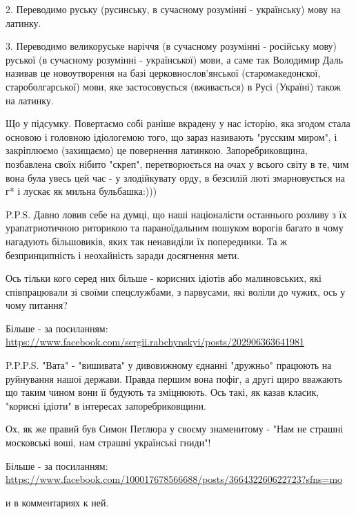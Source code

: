 2. Переводимо руську (русинську, в сучасному розумінні - українську) мову на
латинку.

3. Переводимо великоруське наріччя (в сучасному розумінні - російську мову)
руської (в сучасному розумінні - української) мови, а саме так Володимир Даль
називав це новоутворення на базі церковнослов'янської (старомакедонскої,
староболгарської) мови, яке застосовується (вживається) в Русі (Україні) також
на латинку.

Що у підсумку. Повертаємо собі раніше вкрадену у нас історію, яка згодом стала
основою і головною ідіологемою того, що зараз називають "русским миром", і
закріплюємо (захищаємо) це повернення латинкою. Запоребриковщина, позбавлена
своїх нібито "скреп", перетворюється на очах у всього світу в те, чим вона була
увесь цей час - у злодійкувату орду, в безсилій люті змарновується на г* і
лускає як мильна бульбашка:)))

P.P.S. Давно ловив себе на думці, що наші націоналісти останнього розливу з їх
урапатриотичною риторикою та параноїдальним пошуком ворогів багато в чому
нагадують більшовиків, яких так ненавиділи їх попередники. Та ж безпринципність
і неохайність заради досягнення мети.  

Ось тільки кого серед них більше - корисних ідіотів або малиновських, які
співпрацювали зі своїми спецслужбами, з парвусами, які воліли до чужих, ось у
чому питання?

Більше - за посиланням: \url{https://www.facebook.com/sergii.rabchynskyi/posts/202906363641981}

P.P.P.S. "Вата" - "вишивата" у дивовижному єднанні "дружньо" працюють на
руйнування нашої держави. Правда першим вона пофіг, а другі щиро вважають що
таким чином вони її будують та зміцнюють. Ось такі, як казав класик, "корисні
ідіоти" в інтересах запоребриковщини.

Ох, як же правий був Симон Петлюра у своєму знаменитому - "Нам не страшні московські воші, нам страшні українські гниди"!

Більше - за посиланням:
\url{https://www.facebook.com/100017678566688/posts/366432260622723?sfns=mo}  

и в комментариях к ней.

